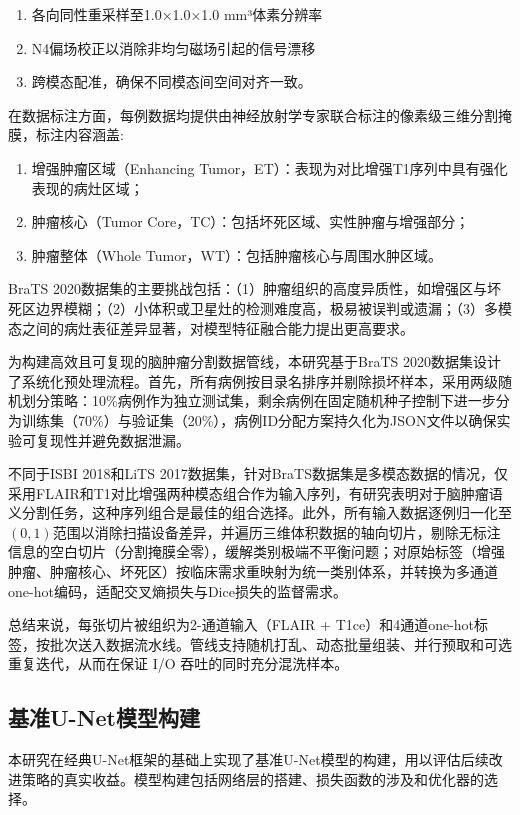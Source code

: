 \begin{enumerate}
    \item 各向同性重采样至1.0×1.0×1.0 mm³体素分辨率
    \item N4偏场校正以消除非均匀磁场引起的信号漂移
    \item 跨模态配准，确保不同模态间空间对齐一致。
\end{enumerate}

在数据标注方面，每例数据均提供由神经放射学专家联合标注的像素级三维分割掩膜，标注内容涵盖:

\begin{enumerate}
    \item 增强肿瘤区域（Enhancing Tumor，ET）：表现为对比增强T1序列中具有强化表现的病灶区域；
    \item 肿瘤核心（Tumor Core，TC）：包括坏死区域、实性肿瘤与增强部分；
    \item 肿瘤整体（Whole Tumor，WT）：包括肿瘤核心与周围水肿区域。
\end{enumerate}

BraTS 2020数据集的主要挑战包括：（1）肿瘤组织的高度异质性，如增强区与坏死区边界模糊；（2）小体积或卫星灶的检测难度高，极易被误判或遗漏；（3）多模态之间的病灶表征差异显著，对模型特征融合能力提出更高要求。

为构建高效且可复现的脑肿瘤分割数据管线，本研究基于BraTS 2020数据集设计了系统化预处理流程。首先，所有病例按目录名排序并剔除损坏样本，采用两级随机划分策略：10\%病例作为独立测试集，剩余病例在固定随机种子控制下进一步分为训练集（70\%）与验证集（20\%），病例ID分配方案持久化为JSON文件以确保实验可复现性并避免数据泄漏。

不同于ISBI 2018和LiTS 2017数据集，针对BraTS数据集是多模态数据的情况，仅采用FLAIR和T1对比增强两种模态组合作为输入序列，有研究表明对于脑肿瘤语义分割任务，这种序列组合是最佳的组合选择\cite{buchner2023}。此外，所有输入数据逐例归一化至$(0,1)$范围以消除扫描设备差异，并遍历三维体积数据的轴向切片，剔除无标注信息的空白切片（分割掩膜全零），缓解类别极端不平衡问题；对原始标签（增强肿瘤、肿瘤核心、坏死区）按临床需求重映射为统一类别体系，并转换为多通道one-hot编码，适配交叉熵损失与Dice损失的监督需求。

总结来说，每张切片被组织为2-通道输入（FLAIR + T1ce）和4通道one-hot标签，按批次送入数据流水线。管线支持随机打乱、动态批量组装、并行预取和可选重复迭代，从而在保证 I/O 吞吐的同时充分混洗样本。

\subsection{基准U-Net模型构建}
本研究在经典U-Net框架的基础上实现了基准U-Net模型的构建，用以评估后续改进策略的真实收益。模型构建包括网络层的搭建、损失函数的涉及和优化器的选择。

